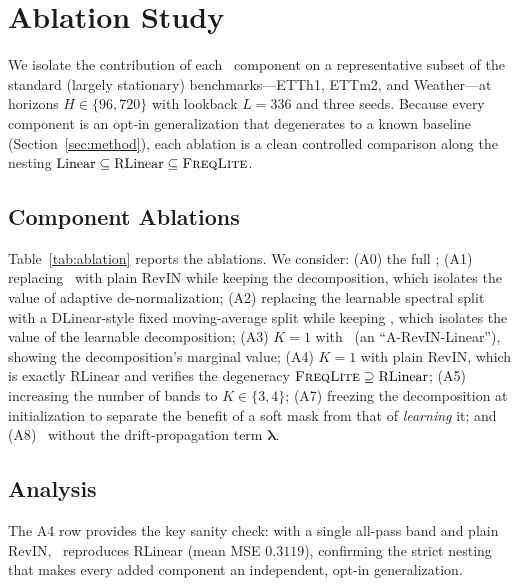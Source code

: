 \section{Ablation Study}
\label{sec:ablation}

We isolate the contribution of each \method\ component on a representative subset
of the standard (largely stationary) benchmarks---ETTh1, ETTm2, and
Weather---at horizons $H \in \{96, 720\}$ with lookback $L{=}336$ and three
seeds. Because every component is an opt-in generalization that degenerates to a
known baseline (Section~\ref{sec:method}), each ablation is a clean controlled
comparison along the nesting $\text{Linear} \subseteq \text{RLinear} \subseteq
\textsc{FreqLite}$.

\subsection{Component Ablations}
\label{sec:ablation:components}

Table~\ref{tab:ablation} reports the ablations. We consider: (A0) the full
\method; (A1) replacing \arevin\ with plain RevIN while keeping the decomposition,
which isolates the value of adaptive de-normalization; (A2) replacing the
learnable spectral split with a DLinear-style fixed moving-average split while
keeping \arevin, which isolates the value of the learnable decomposition; (A3)
$K{=}1$ with \arevin\ (an ``A-RevIN-Linear''), showing the decomposition's
marginal value; (A4) $K{=}1$ with plain RevIN, which is exactly RLinear and
verifies the degeneracy $\textsc{FreqLite} \supseteq \text{RLinear}$; (A5) increasing the
number of bands to $K \in \{3,4\}$; (A7) freezing the decomposition at
initialization to separate the benefit of a soft mask from that of
\emph{learning} it; and (A8) \arevin\ without the drift-propagation term
$\boldsymbol{\lambda}$.


\subsection{Analysis}
\label{sec:ablation:analysis}

The A4 row provides the key sanity check: with a single all-pass band and plain
RevIN, \method\ reproduces RLinear (mean MSE $0.3119$), confirming the strict
nesting that makes every added component an independent, opt-in generalization.

